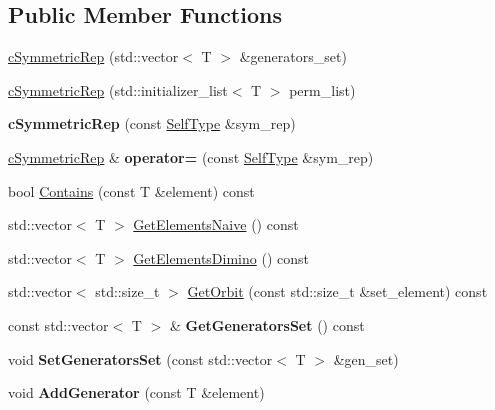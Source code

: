 \subsection*{Public Member Functions}
\begin{DoxyCompactItemize}
\item 
\hyperlink{classcSymmetricRep_a64f4c25b8f5aebbd78f49f3485aed88f}{c\-Symmetric\-Rep} (std\-::vector$<$ T $>$ \&generators\-\_\-set)
\item 
\hyperlink{classcSymmetricRep_a47ba133fe6f1ba2b8d3da5ae6cb001d9}{c\-Symmetric\-Rep} (std\-::initializer\-\_\-list$<$ T $>$ perm\-\_\-list)
\item 
\hypertarget{classcSymmetricRep_a5fa8e9aabcacfddbf5f8d896a9bf6c94}{{\bfseries c\-Symmetric\-Rep} (const \hyperlink{classcSymmetricRep}{Self\-Type} \&sym\-\_\-rep)}\label{classcSymmetricRep_a5fa8e9aabcacfddbf5f8d896a9bf6c94}

\item 
\hypertarget{classcSymmetricRep_a42ce2132ef0a6c51f7afc4496c121cbe}{\hyperlink{classcSymmetricRep}{c\-Symmetric\-Rep} \& {\bfseries operator=} (const \hyperlink{classcSymmetricRep}{Self\-Type} \&sym\-\_\-rep)}\label{classcSymmetricRep_a42ce2132ef0a6c51f7afc4496c121cbe}

\item 
bool \hyperlink{classcSymmetricRep_a60f095284b40e494a34fda76e1fc7ecd}{Contains} (const T \&element) const 
\item 
std\-::vector$<$ T $>$ \hyperlink{classcSymmetricRep_a935cec1dbd90a09581f1aa7f150eb9de}{Get\-Elements\-Naive} () const 
\item 
std\-::vector$<$ T $>$ \hyperlink{classcSymmetricRep_ad9f112b996c14824bd1d669aed162cbf}{Get\-Elements\-Dimino} () const 
\item 
std\-::vector$<$ std\-::size\-\_\-t $>$ \hyperlink{classcSymmetricRep_a62cbd7057456f503eec43d592497e94f}{Get\-Orbit} (const std\-::size\-\_\-t \&set\-\_\-element) const 
\item 
\hypertarget{classcSymmetricRep_af90591a8af82e61668da036efa04a5fd}{const std\-::vector$<$ T $>$ \& {\bfseries Get\-Generators\-Set} () const }\label{classcSymmetricRep_af90591a8af82e61668da036efa04a5fd}

\item 
\hypertarget{classcSymmetricRep_a10df8259eeafac4f03c8d7b251f37dfb}{void {\bfseries Set\-Generators\-Set} (const std\-::vector$<$ T $>$ \&gen\-\_\-set)}\label{classcSymmetricRep_a10df8259eeafac4f03c8d7b251f37dfb}

\item 
\hypertarget{classcSymmetricRep_a59125541fe5801e2073cacb54ed879d8}{void {\bfseries Add\-Generator} (const T \&element)}\label{classcSymmetricRep_a59125541fe5801e2073cacb54ed879d8}


\end{DoxyCompactItemize}
